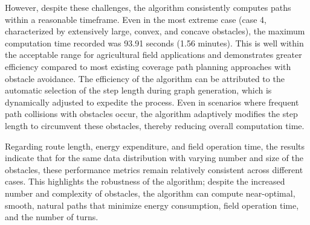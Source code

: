 However, despite these challenges, the algorithm consistently computes paths within a reasonable timeframe. Even in the most extreme case (case 4, characterized by extensively large, convex, and concave obstacles), the maximum computation time recorded was 93.91 seconds (1.56 minutes). This is well within the acceptable range for agricultural field applications and demonstrates greater efficiency compared to most existing coverage path planning approaches with obstacle avoidance. The efficiency of the algorithm can be attributed to the automatic selection of the step length during graph generation, which is dynamically adjusted to expedite the process. Even in scenarios where frequent path collisions with obstacles occur, the algorithm adaptively modifies the step length to circumvent these obstacles, thereby reducing overall computation time.


\vspace*{6mm}

Regarding route length, energy expenditure, and field operation time, the results indicate that for the same data distribution with varying number and size of the obstacles, these performance metrics remain relatively consistent across different cases. This highlights the robustness of the algorithm; despite the increased number and complexity of obstacles, the algorithm can compute near-optimal, smooth, natural paths that minimize energy consumption, field operation time, and the number of turns.
